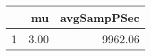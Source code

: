 \begin{table}[h]
\centering
\begin{tabular}{rrr}
  \hline
 & mu & avgSampPSec \\ 
  \hline
1 & 3.00 & 9962.06 \\ 
   \hline
\end{tabular}
\end{table}
